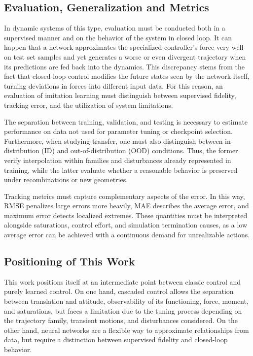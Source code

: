 \subsection{Evaluation, Generalization and Metrics}

In dynamic systems of this type, evaluation must be conducted both in a supervised manner and on the behavior of the system in closed loop. It can happen that a network approximates the specialized controller's force very well on test set samples and yet generates a worse or even divergent trajectory when its predictions are fed back into the dynamics. This discrepancy stems from the fact that closed-loop control modifies the future states seen by the network itself, turning deviations in forces into different input data. For this reason, an evaluation of imitation learning must distinguish between supervised fidelity, tracking error, and the utilization of system limitations.

The separation between training, validation, and testing is necessary to estimate performance on data not used for parameter tuning or checkpoint selection. Furthermore, when studying transfer, one must also distinguish between in-distribution (ID) and out-of-distribution (OOD) conditions. Thus, the former verify interpolation within families and disturbances already represented in training, while the latter evaluate whether a reasonable behavior is preserved under recombinations or new geometries.

Tracking metrics must capture complementary aspects of the error. In this way, RMSE penalizes large errors more heavily, MAE describes the average error, and maximum error detects localized extremes. These quantities must be interpreted alongside saturations, control effort, and simulation termination causes, as a low average error can be achieved with a continuous demand for unrealizable actions.

\subsection{Positioning of This Work}

This work positions itself at an intermediate point between classic control and purely learned control. On one hand, cascaded control allows the separation between translation and attitude, observability of its functioning, force, moment, and saturations, but faces a limitation due to the tuning process depending on the trajectory family, transient motions, and disturbances considered. On the other hand, neural networks are a flexible way to approximate relationships from data, but require a distinction between supervised fidelity and closed-loop behavior.

